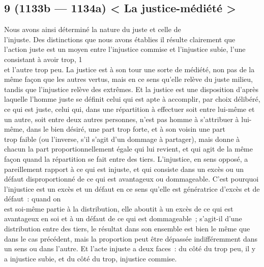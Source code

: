 \documentclass[french,twoside]{book} %
\begin{document}
\subsection[{9 (1133b — 1134a) < La justice-médiété >}]{9 (1133b — 1134a) < La justice-médiété >}
\noindent Nous avons ainsi déterminé la nature du juste et celle de \\
l’injuste. Des distinctions que nous avons établies il résulte clairement que l’action juste est un moyen entre l’injustice commise et l’injustice subie, l’une consistant à avoir trop, 1\\
et l’autre trop peu. La justice est à son tour une sorte de médiété, non pas de la même façon que les autres vertus, mais en ce sens  qu’elle relève du juste milieu, tandis que l’injustice relève des extrêmes. Et la justice est une disposition d’après laquelle l’homme juste se définit celui qui est apte à accomplir, par choix délibéré, ce qui est juste, celui qui, dans une répartition à effectuer soit entre lui-même et un autre, soit entre deux autres personnes, n’est pas homme à s’attribuer à lui-même, dans le bien désiré, une part trop forte, et à son voisin une part \\
trop faible (ou l’inverse, s’il s’agit d’un dommage à partager), mais donne à chacun la part proportionnellement égale qui lui revient, et qui agit de la même façon quand la répartition se fait entre des tiers. L’injustice, en sens opposé, a pareillement rapport à ce qui est injuste, et qui consiste dans un excès ou un défaut disproportionné de ce qui est avantageux ou dommageable. C’est pourquoi l’injustice est un excès et un défaut en ce sens qu’elle est génératrice d’excès et de défaut : quand on \\
est soi-même partie à la distribution, elle aboutit à un excès de ce qui est avantageux en soi et à un défaut de ce qui est dommageable ; s’agit-il d’une distribution entre des tiers, le résultat dans son ensemble est bien le même que dans le cas précédent, mais la proportion peut être dépassée indifféremment dans un sens ou dans l’autre. Et l’acte injuste a deux faces : du côté du trop peu, il y a injustice subie, et du côté du trop, injustice commise.
\end{document}
